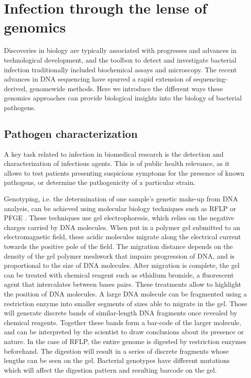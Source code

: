 
\chapter{Infection through the lense of genomics} %

\label{ch:01-02} %


Discoveries in biology are typically associated with progresses and advances in technological development, and the toolbox to detect and investigate bacterial infection traditionally included biochemical assays and microscopy. The recent advances in DNA sequencing have spurred a rapid extension of sequencing-derived, genomewide methods. Here we introduce the different ways these genomics approaches can provide biological insights into the biology of bacterial pathogens.

\section{Pathogen characterization}

A key task related to infection in biomedical research is the detection and characterization of infectious agents. This is of public health relevance, as it allows to test patients presenting suspicious symptoms for the presence of known pathogens, or determine the pathogenicity of a particular strain. 

Genotyping, i.e. the determination of one sample's genetic make-up from DNA analysis, can be achieved using molecular biology techniques such as \acrfull{RFLP} or \acrfull{PFGE} \cite{ochoa-diazBacterialGenotypingMethods2018}. These techniques use gel electrophoresis, which relies on the negative charges carried by DNA molecules. When put in a polymer gel submitted to an electromagnetic field, these acidic molecules migrate along the electrical current towards the positive pole of the field. The migration distance depends on the density of the gel polymer meshwork that impairs progression of DNA, and is proportional to the size of DNA molecules. After migration is complete, the gel can be treated with chemical reagent such as ethidium bromide, a fluorescent agent that intercalates between bases pairs. These treatments allow to highlight the position of DNA molecules. A large DNA molecule can be fragmented using a \Gls{restriction enzyme} into smaller segments of sizes able to migrate in the gel. Those will generate discrete bands of similar-length DNA fragments once revealed by chemical reagents. Together these bands form a bar-code of the larger molecule, and can be interpreted by the scientist to draw conclusions about its presence or nature. In the case of \acrshort{RFLP}, the entire genome is digested by restriction enzymes beforehand. The digestion will result in a series of discrete fragments whose lengths can be seen on the gel. Bacterial genotypes have different mutations which will affect the digestion pattern and resulting barcode on the gel.

